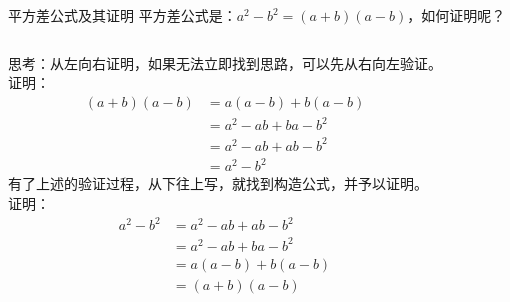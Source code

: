 \documentclass[aspectratio=169]{ctexbeamer} %
\begin{document}
\begin{frame}[t]{平方差公式及其证明}
平方差公式是：$a^2 - b^2 = (a + b)(a - b)$，如何证明呢？
\vspace{1cm}
\begin{columns}[t]
思考：从左向右证明，如果无法立即找到思路，可以先从右向左验证。\\
证明：
\begin{align*}
  (a + b)(a - b) &= a(a - b) + b(a - b)  \\
  &= a^2 - ab + ba - b^2 \\
  &= a^2 - ab + ab - b^2 \\
  &= a^2 - b^2
\end{align*}
 有了上述的验证过程，从下往上写，就找到构造公式，并予以证明。\\
 证明：
\begin{align*}
  a^2 - b^2  &= a^2 - ab + ab - b^2 \\
  &= a^2 - ab + ba - b^2 \\
  &= a(a - b) + b(a - b) \\
  &= (a + b)(a - b) 
 \end{align*}
\end{columns}
\end{frame}
\end{document}
